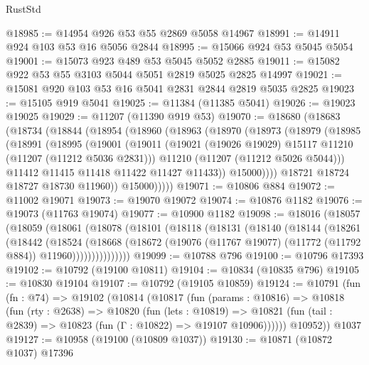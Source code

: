\begin{lexlean}{RustStd}
\begin{coremodule}
@18985 := @14954 @926 @53 @55 @2869 @5058 @14967
@18991 := @14911 @924 @103 @53 @16 @5056 @2844
@18995 := @15066 @924 @53 @5045 @5054
@19001 := @15073 @923 @489 @53 @5045 @5052 @2885
@19011 := @15082 @922 @53 @55 @3103 @5044 @5051 @2819 @5025 @2825 @14997
@19021 := @15081 @920 @103 @53 @16 @5041 @2831 @2844 @2819 @5035 @2825
@19023 := @15105 @919 @5041
@19025 := @11384 (@11385 @5041)
@19026 := @19023 @19025
@19029 := @11207 (@11390 @919 @53)
@19070 := @18680
    (@18683
      (@18734
        (@18844
          (@18954
            (@18960
              (@18963
                (@18970
                  (@18973
                    (@18979
                      (@18985
                        (@18991
                          (@18995
                            (@19001
                              (@19011
                                (@19021 (@19026 @19029) @15117 @11210 (@11207 (@11212 @5036 @2831)))
                                @11210
                                (@11207 (@11212 @5026 @5044)))
                              @11412
                              @11415
                              @11418
                              @11422
                              @11427
                              @11433))
                          @15000))))
                  @18721
                  @18724
                  @18727
                  @18730
                  @11960))
              @15000)))))
@19071 := @10806 @884
@19072 := @11002 @19071
@19073 := @19070 @19072
@19074 := @10876 @1182
@19076 := @19073 (@11763 @19074)
@19077 := @10900 @1182
@19098 := @18016
    (@18057
      (@18059
        (@18061
          (@18078
            (@18101
              (@18118
                (@18131
                  (@18140
                    (@18144
                      (@18261
                        (@18442
                          (@18524
                            (@18668
                              (@18672
                                (@19076 (@11767 @19077) (@11772 (@11792 @884)) @11960)))))))))))))))
@19099 := @10788 @796
@19100 := @10796 @17393
@19102 := @10792 (@19100 @10811)
@19104 := @10834 (@10835 @796)
@19105 := @10830 @19104
@19107 := @10792 (@19105 @10859)
@19124 := @10791
    (fun (fn : @74) =>
    @19102
      (@10814
        (@10817
          (fun (params : @10816) =>
          @10818
            (fun (rty : @2638) =>
            @10820
              (fun (lets : @10819) =>
              @10821 (fun (tail : @2839) => @10823 (fun (Γ : @10822) => @19107 @10906))))))
        @10952))
    @1037
@19127 := @10958 (@19100 (@10809 @1037))
@19130 := @10871 (@10872 @1037) @17396

\end{coremodule}
\end{lexlean}
